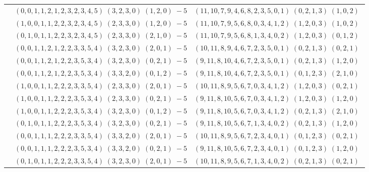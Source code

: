 \documentclass[11pt]{article}
\begin{document}
\begin{longtable}[l]{|c|c|c|}
 \cline{2-3} 
 & $(0 ,0 ,1 ,1 ,2 ,1 ,2 ,3 ,2 ,3 ,4 ,5) \;(3 ,2 ,3 ,0) \;(1 ,2 ,0) \;-5$ & $(11 ,10 ,7 ,9 ,4 ,6 ,8 ,2 ,3 ,5 ,0 ,1) \;(0 ,2 ,1 ,3) \;(1 ,0 ,2) \;$\\ 
 \cline{2-3} 
 & $(1 ,0 ,0 ,1 ,1 ,2 ,2 ,3 ,2 ,3 ,4 ,5) \;(2 ,3 ,3 ,0) \;(1 ,2 ,0) \;-5$ & $(11 ,10 ,7 ,9 ,5 ,6 ,8 ,0 ,3 ,4 ,1 ,2) \;(1 ,2 ,0 ,3) \;(1 ,0 ,2) \;$\\ 
 \cline{2-3} 
 & $(0 ,1 ,0 ,1 ,1 ,2 ,2 ,3 ,2 ,3 ,4 ,5) \;(2 ,3 ,3 ,0) \;(2 ,1 ,0) \;-5$ & $(11 ,10 ,7 ,9 ,5 ,6 ,8 ,1 ,3 ,4 ,0 ,2) \;(1 ,2 ,0 ,3) \;(0 ,1 ,2) \;$\\ 
 \cline{2-3} 
 & $(0 ,0 ,1 ,1 ,2 ,1 ,2 ,2 ,3 ,3 ,5 ,4) \;(3 ,2 ,3 ,0) \;(2 ,0 ,1) \;-5$ & $(10 ,11 ,8 ,9 ,4 ,6 ,7 ,2 ,3 ,5 ,0 ,1) \;(0 ,2 ,1 ,3) \;(0 ,2 ,1) \;$\\ 
 \cline{2-3} 
 & $(0 ,0 ,1 ,1 ,2 ,1 ,2 ,2 ,3 ,5 ,3 ,4) \;(3 ,2 ,3 ,0) \;(0 ,2 ,1) \;-5$ & $(9 ,11 ,8 ,10 ,4 ,6 ,7 ,2 ,3 ,5 ,0 ,1) \;(0 ,2 ,1 ,3) \;(1 ,2 ,0) \;$\\ 
 \cline{2-3} 
 & $(0 ,0 ,1 ,1 ,2 ,1 ,2 ,2 ,3 ,5 ,3 ,4) \;(3 ,3 ,2 ,0) \;(0 ,1 ,2) \;-5$ & $(9 ,11 ,8 ,10 ,4 ,6 ,7 ,2 ,3 ,5 ,0 ,1) \;(0 ,1 ,2 ,3) \;(2 ,1 ,0) \;$\\ 
 \cline{2-3} 
 & $(1 ,0 ,0 ,1 ,1 ,2 ,2 ,2 ,3 ,3 ,5 ,4) \;(2 ,3 ,3 ,0) \;(2 ,0 ,1) \;-5$ & $(10 ,11 ,8 ,9 ,5 ,6 ,7 ,0 ,3 ,4 ,1 ,2) \;(1 ,2 ,0 ,3) \;(0 ,2 ,1) \;$\\ 
 \cline{2-3} 
 & $(1 ,0 ,0 ,1 ,1 ,2 ,2 ,2 ,3 ,5 ,3 ,4) \;(2 ,3 ,3 ,0) \;(0 ,2 ,1) \;-5$ & $(9 ,11 ,8 ,10 ,5 ,6 ,7 ,0 ,3 ,4 ,1 ,2) \;(1 ,2 ,0 ,3) \;(1 ,2 ,0) \;$\\ 
 \cline{2-3} 
 & $(1 ,0 ,0 ,1 ,1 ,2 ,2 ,2 ,3 ,5 ,3 ,4) \;(3 ,2 ,3 ,0) \;(0 ,1 ,2) \;-5$ & $(9 ,11 ,8 ,10 ,5 ,6 ,7 ,0 ,3 ,4 ,1 ,2) \;(0 ,2 ,1 ,3) \;(2 ,1 ,0) \;$\\ 
 \cline{2-3} 
 & $(0 ,1 ,0 ,1 ,1 ,2 ,2 ,2 ,3 ,5 ,3 ,4) \;(3 ,2 ,3 ,0) \;(0 ,2 ,1) \;-5$ & $(9 ,11 ,8 ,10 ,5 ,6 ,7 ,1 ,3 ,4 ,0 ,2) \;(0 ,2 ,1 ,3) \;(1 ,2 ,0) \;$\\ 
 \cline{2-3} 
 & $(0 ,0 ,1 ,1 ,1 ,2 ,2 ,2 ,3 ,3 ,5 ,4) \;(3 ,3 ,2 ,0) \;(2 ,0 ,1) \;-5$ & $(10 ,11 ,8 ,9 ,5 ,6 ,7 ,2 ,3 ,4 ,0 ,1) \;(0 ,1 ,2 ,3) \;(0 ,2 ,1) \;$\\ 
 \cline{2-3} 
 & $(0 ,0 ,1 ,1 ,1 ,2 ,2 ,2 ,3 ,5 ,3 ,4) \;(3 ,3 ,2 ,0) \;(0 ,2 ,1) \;-5$ & $(9 ,11 ,8 ,10 ,5 ,6 ,7 ,2 ,3 ,4 ,0 ,1) \;(0 ,1 ,2 ,3) \;(1 ,2 ,0) \;$\\ 
 \cline{2-3} 
 & $(0 ,1 ,0 ,1 ,1 ,2 ,2 ,2 ,3 ,3 ,5 ,4) \;(3 ,2 ,3 ,0) \;(2 ,0 ,1) \;-5$ & $(10 ,11 ,8 ,9 ,5 ,6 ,7 ,1 ,3 ,4 ,0 ,2) \;(0 ,2 ,1 ,3) \;(0 ,2 ,1) \;$\\ 

\end{longtable}
\end{document}
